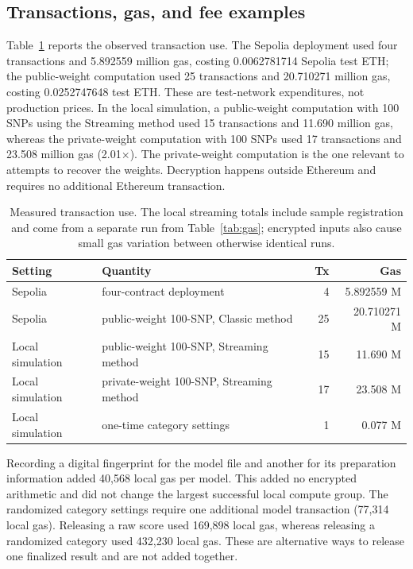 \documentclass[10pt]{article}
\begin{document}
\subsection{Transactions, gas, and fee examples}

Table~\ref{tab:cost} reports the observed transaction use.  The Sepolia deployment used
four transactions and 5.892559 million gas, costing 0.0062781714 Sepolia test ETH; the
public-weight computation used 25 transactions and 20.710271
million gas, costing 0.0252747648 test ETH.  These are test-network expenditures, not
production prices.  In the local simulation, a public-weight computation with 100 SNPs
using the Streaming method used 15 transactions and 11.690 million gas, whereas the
private-weight computation with 100 SNPs used 17 transactions and 23.508 million gas
(2.01$\times$).  The private-weight computation is the one relevant to attempts to
recover the weights.  Decryption happens outside Ethereum and requires no additional
Ethereum transaction.

\begin{table}[ht]
\centering
\caption{Measured transaction use. The local streaming totals include sample
registration and come from a separate run from Table~\ref{tab:gas}; encrypted inputs also
cause small gas variation between otherwise identical runs.}
\label{tab:cost}
\footnotesize
\setlength{\tabcolsep}{2pt}
\begin{tabularx}{\columnwidth}{@{}lXrr@{}}
\toprule
\textbf{Setting} & \textbf{Quantity} & \textbf{Tx} & \textbf{Gas} \\
\midrule
Sepolia & four-contract deployment & 4 & 5.892559 M \\
Sepolia & public-weight 100-SNP, Classic method & 25 & 20.710271 M \\
Local simulation & public-weight 100-SNP, Streaming method & 15 & 11.690 M \\
Local simulation & private-weight 100-SNP, Streaming method & 17 & 23.508 M \\
Local simulation & one-time category settings & 1 & 0.077 M \\
\bottomrule
\end{tabularx}
\end{table}

Recording a digital fingerprint for the model file and another for its preparation information
added 40,568 local gas per model. This added no encrypted arithmetic and did not change the
largest successful local compute group.  The
randomized category settings require one additional model transaction (77,314 local gas).
Releasing a raw score used 169,898 local gas, whereas releasing a randomized category
used 432,230 local gas. These
are alternative ways to release one finalized result and are not added together.
\end{document}
